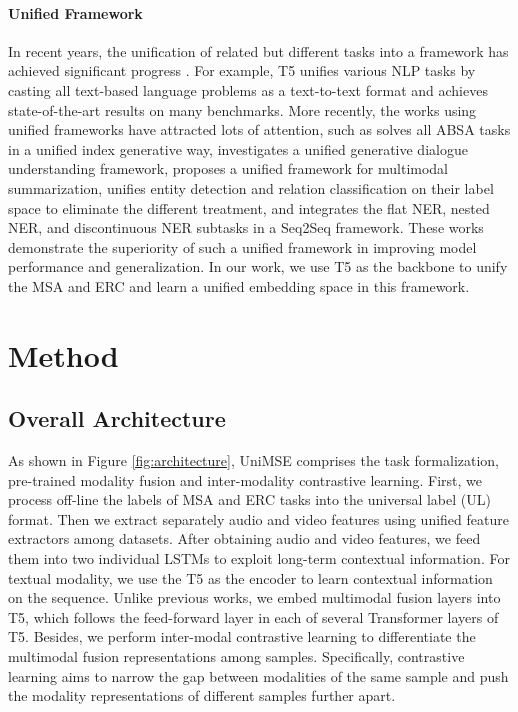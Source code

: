 \documentclass[11pt]{article}
\begin{document}
\paragraph{Unified Framework}
In recent years, the unification of related but different tasks into a framework has achieved significant progress \cite{DBLP:journals/corr/abs-2204-04637,DBLP:journals/corr/abs-2201-05966,DBLP:conf/aaai/ZhangMWJLY22}. For example, T5 \cite{DBLP:journals/jmlr/RaffelSRLNMZLL20} unifies various NLP tasks by casting all text-based language problems as a text-to-text format and achieves state-of-the-art results on many benchmarks. More recently, the works \cite{DBLP:journals/corr/abs-2111-02358,DBLP:conf/emnlp/ChengYZS21,DBLP:journals/corr/abs-2111-02358} using unified frameworks have attracted lots of attention, such as \citet{DBLP:conf/acl/YanDJQ020} solves all ABSA tasks in a unified index generative way,  \citet{DBLP:journals/corr/abs-2204-04637} investigates a unified generative dialogue understanding framework, \citet{DBLP:journals/corr/abs-2109-05812} proposes a unified framework for multimodal summarization, \citet{DBLP:conf/acl/WangSWZLY20} unifies entity detection and relation classification on their label space to eliminate the different treatment, and \citet{DBLP:conf/acl/YanGDGZQ20} integrates the flat NER, nested NER, and discontinuous NER subtasks in a Seq2Seq framework. These works demonstrate the superiority of such a unified framework in improving model performance and generalization. In our work, we use T5 as the backbone to unify the MSA and ERC and learn a unified embedding space in this framework.




\section{Method}

\subsection{Overall Architecture}
As shown in Figure \ref{fig:architecture}, UniMSE comprises the task formalization, pre-trained modality fusion and inter-modality contrastive learning. First, we process off-line the labels of MSA and ERC tasks into the universal label (UL) format. Then we extract separately audio and video features using unified feature extractors among datasets. After obtaining audio and video features, we feed them into two individual LSTMs to exploit long-term contextual information. For textual modality, we use the T5 as the encoder to learn contextual information on the sequence. Unlike previous works, we embed multimodal fusion layers into T5, which follows the feed-forward layer in each of several Transformer layers of T5. Besides, we perform inter-modal contrastive learning to differentiate the multimodal fusion representations among samples. Specifically, contrastive learning aims to narrow the gap between modalities of the same sample and push the modality representations of different samples further apart.
\end{document}
